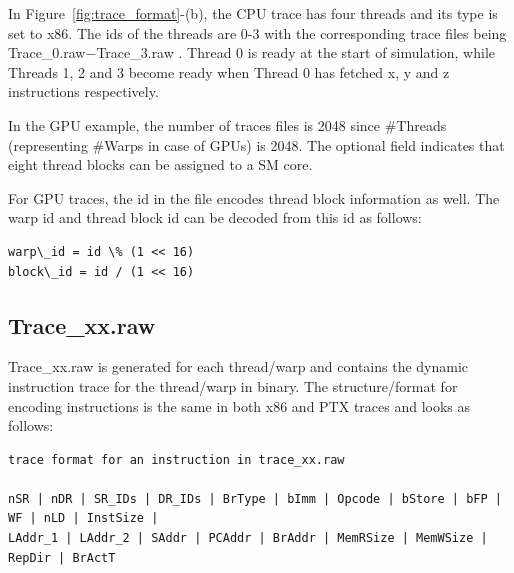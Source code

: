 
In Figure~\ref{fig:trace_format}-(b), the CPU trace has four threads and its
type is set to x86. The ids of the threads are 0-3 with the corresponding trace
files being Trace\_0.raw$-$Trace\_3.raw . Thread 0 is ready at the start of
simulation, while Threads 1, 2 and 3 become ready when Thread 0 has fetched x,
  y and z instructions respectively.


In the GPU example, the number of traces files is 2048 since \#Threads
(representing \#Warps in case of GPUs) is 2048.  The optional field indicates
that eight thread blocks can be assigned to a SM core. 

For GPU traces, the id in the file encodes thread block information as
well. The warp id and thread block id can be decoded from this id as follows:

\begin{Verbatim}
warp\_id = id \% (1 << 16)
block\_id = id / (1 << 16)
\end{Verbatim}


\subsection{Trace\_xx.raw}

Trace\_xx.raw is generated for each thread/warp and contains the dynamic
instruction trace for the thread/warp in binary. The structure/format for
encoding instructions is the same in both x86 and PTX traces and looks as
follows:


\begin{Verbatim}
trace format for an instruction in trace_xx.raw

nSR | nDR | SR_IDs | DR_IDs | BrType | bImm | Opcode | bStore | bFP | WF | nLD | InstSize |
LAddr_1 | LAddr_2 | SAddr | PCAddr | BrAddr | MemRSize | MemWSize | RepDir | BrActT 
\end{Verbatim}



